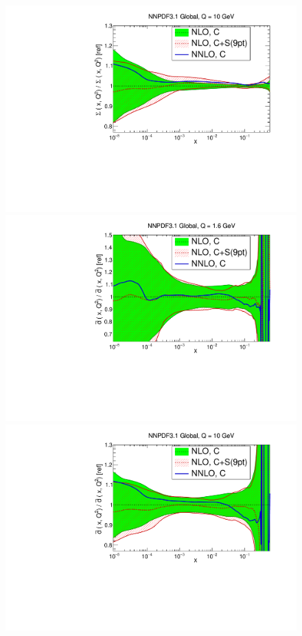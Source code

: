 \begin{figure}[H]
\begin{center}
    \includegraphics[scale=0.35]{mhous/plots/xsinglet-Global-NLO-CovMatTH-EXP-vsTH.pdf}
         \includegraphics[scale=0.35]{mhous/plots/xdbar-Global-NLO-CovMatTH-EXP-vsTH16.pdf}
    \includegraphics[scale=0.35]{mhous/plots/xdbar-Global-NLO-CovMatTH-EXP-vsTH.pdf}

\end{center}
\end{figure}
